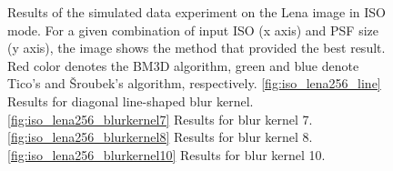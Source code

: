 \documentclass[12pt,notitlepage]{report}
\begin{document}
\begin{figure}[htb]
  \caption[Results of the simulated data experiment on the Lena image in ISO mode]{Results of the simulated data experiment on the Lena image in ISO mode. For a given combination of input ISO (x axis) and PSF size (y axis), the image shows the method that provided the best result. Red color denotes the BM3D algorithm, green and blue denote Tico's and Šroubek's algorithm, respectively. \ref{fig:iso_lena256_line} Results for diagonal line-shaped blur kernel. \ref{fig:iso_lena256_blurkernel7} Results for blur kernel 7. \ref{fig:iso_lena256_blurkernel8} Results for blur kernel 8. \ref{fig:iso_lena256_blurkernel10} Results for blur kernel 10.}
  \label{fig:iso_lena256}
\end{figure}

\clearpage
\end{document}
